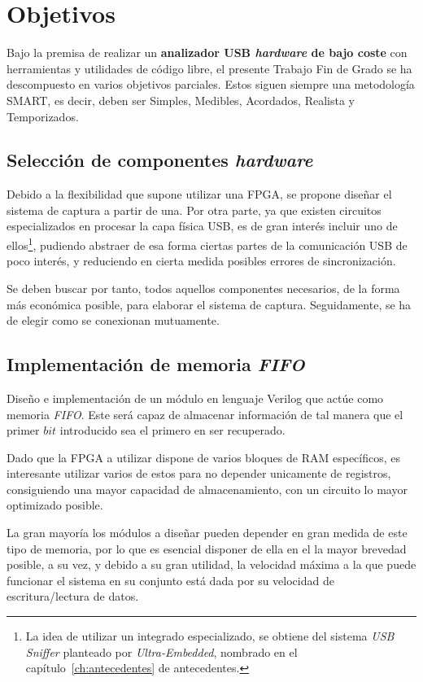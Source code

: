 \chapter{Objetivos}
\label{ch:objetivos}

Bajo la premisa de realizar un \textbf{analizador USB \emph{hardware} de bajo coste} con herramientas y utilidades de código libre, el presente Trabajo Fin de Grado se ha descompuesto en varios objetivos parciales. Estos siguen siempre una metodología SMART, es decir, deben ser Simples, Medibles, Acordados, Realista y Temporizados.

\section{Selección de componentes \emph{hardware}}
Debido a la flexibilidad que supone utilizar una FPGA\cite{monmasson2007fpga}, se propone diseñar el sistema de captura a partir de una. Por otra parte, ya que existen circuitos especializados en procesar la capa física USB, es de gran interés incluir uno de ellos\footnote{La idea de utilizar un integrado especializado, se obtiene del sistema \emph{USB Sniffer} planteado por \emph{Ultra-Embedded}, nombrado en el capítulo~\ref{ch:antecedentes} de antecedentes.}, pudiendo abstraer de esa forma ciertas partes de la comunicación USB de poco interés, y reduciendo en cierta medida posibles errores de sincronización.

Se deben buscar por tanto, todos aquellos componentes necesarios, de la forma más económica posible, para elaborar el sistema de captura. Seguidamente, se ha de elegir como se conexionan mutuamente.

\section{Implementación de memoria \emph{FIFO}}
Diseño e implementación de un módulo en lenguaje Verilog que actúe como memoria \emph{FIFO}. Este será capaz de almacenar información de tal manera que el primer $bit$ introducido sea el primero en ser recuperado.

Dado que la FPGA a utilizar dispone de varios bloques de RAM específicos, es interesante utilizar varios de estos para no depender unicamente de registros, consiguiendo una mayor capacidad de almacenamiento, con un circuito lo mayor optimizado posible.

La gran mayoría los módulos a diseñar pueden depender en gran medida de este tipo de memoria, por lo que es esencial disponer de ella en el la mayor brevedad posible, a su vez, y debido a su gran utilidad, la velocidad\cite{rose1993architecture} máxima a la que puede funcionar el sistema en su conjunto está dada por su velocidad de escritura/lectura de datos.

